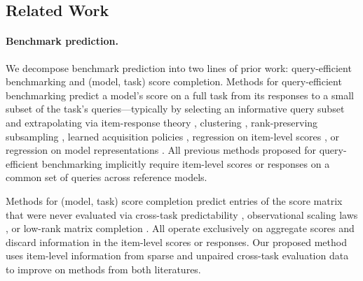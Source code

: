 \documentclass{article}
\theoremstyle{definition}
\theoremstyle{remark}
\theoremstyle{plain}
\begin{document}
\subsection{Related Work}
\label{sec:related}

\paragraph{Benchmark prediction.}
We decompose benchmark prediction into two lines of prior work: query-efficient
benchmarking and (model, task) score completion.
Methods for query-efficient benchmarking predict a model's score on a full task from
its responses to a small subset of the task's queries---typically by selecting an
informative query subset and extrapolating via item-response theory
\citep{polo2024tinybenchmarks, hofmann2025fluid}, clustering
\citep{vivek2024anchor}, rank-preserving subsampling \citep{perlitz2024efficient},
learned acquisition policies \citep{li2024active}, regression on item-level scores
\citep{bowyer2026efficient}, or regression on model representations
\citep{dkps_qeff}.
All previous methods proposed for query-efficient benchmarking implicitly require
item-level scores or responses on a common set of queries across reference models.

Methods for (model, task) score completion predict entries of the score matrix that
were never evaluated via cross-task predictability \citep{ye2023predictable},
observational scaling laws \citep{ruan2024observational}, or low-rank matrix
completion \citep{benchpress}. All operate exclusively on aggregate scores and
discard information in the item-level scores or responses.
Our proposed method uses item-level information from sparse and unpaired cross-task evaluation
data to improve on methods from both literatures.
\end{document}
